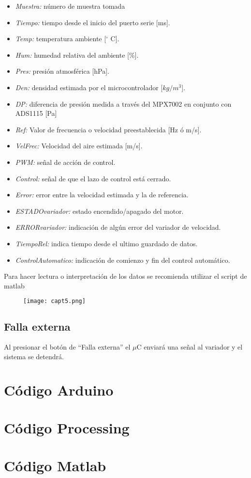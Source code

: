 \begin{itemize}
	\item \textit{Muestra:} número de muestra tomada
	\item \textit{Tiempo:} tiempo desde el inicio del puerto serie [ms].
	\item \textit{Temp:} temperatura ambiente [$^{\circ}$ C].
	\item \textit{Hum:} humedad relativa del ambiente [\%].
	\item \textit{Pres:} presión atmosférica [hPa].
	\item \textit{Den:} densidad estimada por el microcontrolador [$kg/m^3$].
	\item \textit{DP:} diferencia de presión medida a través del MPX7002 en conjunto con ADS1115 [Pa]
	\item \textit{Ref:} Valor de frecuencia o velocidad preestablecida [Hz ó m/s].
	\item \textit{VelFrec:} Velocidad del aire estimada [m/s].
	\item \textit{PWM:} señal de acción de control.
	\item \textit{Control:} señal de que el lazo de control está cerrado.
	\item \textit{Error:} error entre la velocidad estimada y la de referencia.
	\item \textit{ESTADOvariador:} estado encendido/apagado del motor.
	\item \textit{ERRORvariador:} indicación de algún error del variador de velocidad.
	\item \textit{TiempoRel:} indica tiempo desde el ultimo guardado de datos.
	\item \textit{ControlAutomatico:} indicación de comienzo y fin del control automático.
		
\end{itemize}

Para hacer lectura o interpretación de los datos se recomienda utilizar el script de matlab 

\begin{figure}[H]
	\centering
	\texttt{[image: capt5.png]}
	\label{fig:capt5}
\end{figure}

\subsection{Falla externa}
	Al presionar el botón de “Falla externa” el $\mu$C enviará una señal al variador y el sistema se detendrá.

\newpage
\section{Código Arduino}
\newpage
\section{Código Processing}
\newpage
\section{Código Matlab}

